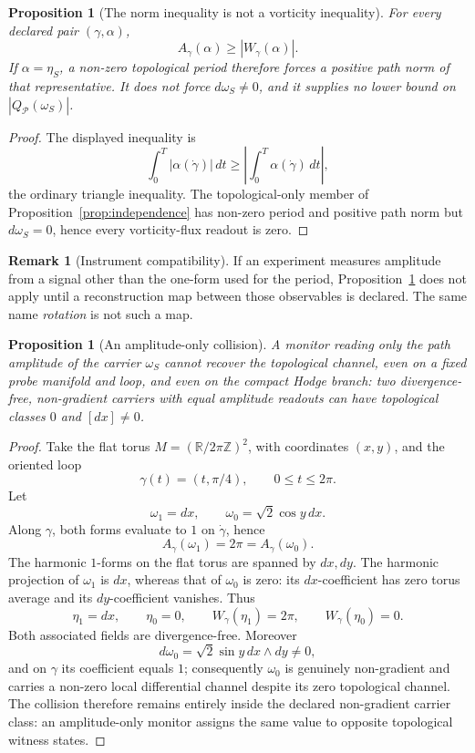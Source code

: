 \documentclass[11pt]{article}
\newtheorem{proposition}[theorem]{Proposition}
\theoremstyle{definition}
\newtheorem{remark}[theorem]{Remark}
\begin{document}
\begin{proposition}[The norm inequality is not a vorticity
inequality]\label{prop:norm}
For every declared pair \((\gamma,\alpha)\),
\[
A_\gamma(\alpha)\ge |W_\gamma(\alpha)|.
\]
If \(\alpha=\eta_S\), a non-zero topological period therefore forces a
positive path norm of that representative.  It does not force
\(d\omega_S\neq0\), and it supplies no lower bound on
\(|Q_{\mathcal P}(\omega_S)|\).
\end{proposition}

\begin{proof}
The displayed inequality is
\[
\int_0^T|\alpha(\dot\gamma)|\,dt
 \ge
\left|\int_0^T\alpha(\dot\gamma)\,dt\right|,
\]
the ordinary triangle inequality.  The topological-only member of
Proposition~\ref{prop:independence} has non-zero period and positive path
norm but \(d\omega_S=0\), hence every vorticity-flux readout is zero.
\end{proof}

\begin{remark}[Instrument compatibility]
If an experiment measures amplitude from a signal other than the
one-form used for the period, Proposition~\ref{prop:norm} does not apply
until a reconstruction map between those observables is declared.  The
same name \emph{rotation} is not such a map.
\end{remark}

\begin{proposition}[An amplitude-only collision]\label{prop:collision}
A monitor reading only the path amplitude of the carrier \(\omega_S\)
cannot recover the topological channel, even on a fixed probe manifold and
loop, and even on the compact Hodge branch: two divergence-free,
non-gradient carriers with equal amplitude readouts can have topological
classes \(0\) and \([dx]\neq0\).
\end{proposition}

\begin{proof}
Take the flat torus
\(M=(\mathbb R/2\pi\mathbb Z)^2\), with coordinates \((x,y)\), and the
oriented loop
\[
\gamma(t)=(t,\pi/4),\qquad 0\le t\le2\pi.
\]
Let
\[
\omega_1=dx,\qquad
\omega_0=\sqrt2\cos y\,dx.
\]
Along \(\gamma\), both forms evaluate to \(1\) on \(\dot\gamma\), hence
\[
A_\gamma(\omega_1)=2\pi=A_\gamma(\omega_0).
\]
The harmonic \(1\)-forms on the flat torus are spanned by \(dx,dy\).
The harmonic projection of \(\omega_1\) is \(dx\), whereas that of
\(\omega_0\) is zero: its \(dx\)-coefficient has zero torus average and its
\(dy\)-coefficient vanishes.  Thus
\[
\eta_1=dx,\qquad \eta_0=0,
\qquad
W_\gamma(\eta_1)=2\pi,\qquad W_\gamma(\eta_0)=0.
\]
Both associated fields are divergence-free.  Moreover
\[
d\omega_0=\sqrt2\sin y\,dx\wedge dy\neq0,
\]
and on \(\gamma\) its coefficient equals \(1\); consequently
\(\omega_0\) is genuinely non-gradient and carries a non-zero local
differential channel despite its zero topological channel.  The collision
therefore remains entirely inside the declared non-gradient carrier class:
an amplitude-only monitor assigns the same value to opposite topological
witness states.
\end{proof}
\end{document}

